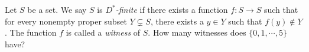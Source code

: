 Let $S$ be a set. We say $S$ is \emph{$D^\ast$-finite} if there exists a function $f : S \to S$ such that for every nonempty proper subset $Y \subsetneq S$, there exists a $y \in Y$ such that $f(y) \notin Y$.  The function $f$ is called a \emph{witness} of $S$.  How many witnesses does $\{0,1,\cdots,5\}$ have?

